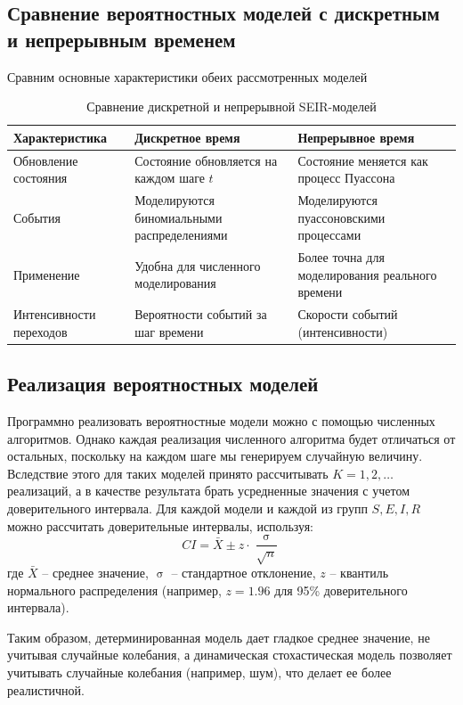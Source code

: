 \documentclass[a4paper, 14pt]{extreport}
\numberwithin{equation}{section}
\renewcommand{\sigma}{\upsigma}
\begin{document}
	\subsection{Сравнение вероятностных моделей с дискретным и непрерывным временем}
	Сравним основные характеристики обеих рассмотренных моделей
	\begin{table}[h]
		\renewcommand{\arraystretch}{1}
		\begin{tabular}{|p{4cm}|p{5.5cm}|p{5.5cm}|}
			\hline
			\textbf{Характеристика} & \textbf{Дискретное время} & \textbf{Непрерывное время} \\ \hline
			Обновление состояния & Состояние обновляется на каждом шаге \( t \) & Состояние меняется как процесс Пуассона \\ \hline
			События & Моделируются биномиальными распределениями & Моделируются пуассоновскими процессами \\ \hline
			Применение & Удобна для численного моделирования & Более точна для моделирования реального времени \\ \hline
			Интенсивности переходов & Вероятности событий за шаг времени & Скорости событий (интенсивности) \\ \hline
		\end{tabular}
		\caption{Сравнение дискретной и непрерывной SEIR-моделей}
	\end{table}
	\subsection{Реализация вероятностных моделей}
	Программно реализовать вероятностные модели можно с помощью численных алгоритмов. Однако каждая реализация численного алгоритма будет отличаться от остальных, поскольку на каждом шаге мы генерируем случайную величину. Вследствие этого для таких моделей принято рассчитывать $K=1,2,\ldots$ реализаций, а в качестве результата брать усредненные значения с учетом доверительного интервала. 
	Для каждой модели и каждой из групп $S, E, I, R$ можно рассчитать доверительные интервалы, используя:
	$$
	CI = \bar{X} \pm z \cdot \frac{\sigma}{\sqrt{n}}
	$$
	где $\bar{X}$ -- среднее значение, $\sigma$ -- стандартное отклонение, $z$ -- квантиль нормального распределения (например, $z = 1.96$ для 95\% доверительного интервала).
	
	Таким образом, детерминированная модель дает гладкое среднее значение, не учитывая случайные колебания, а динамическая стохастическая модель позволяет учитывать случайные колебания (например, шум), что делает ее более реалистичной.
	
\end{document}
